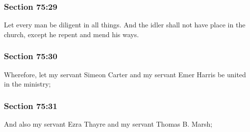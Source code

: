 	\subsubsection{Section 75:29} %
		\label{DC75-29}

		Let every man be diligent in all things.  And the idler shall not have place in the church, except he repent and mend his ways.


	\subsubsection{Section 75:30} %
		\label{DC75-30}

		Wherefore, let my servant Simeon Carter and my servant Emer Harris be united in the ministry;


	\subsubsection{Section 75:31} %
		\label{DC75-31}

		And also my servant Ezra Thayre and my servant Thomas B. Marsh;


